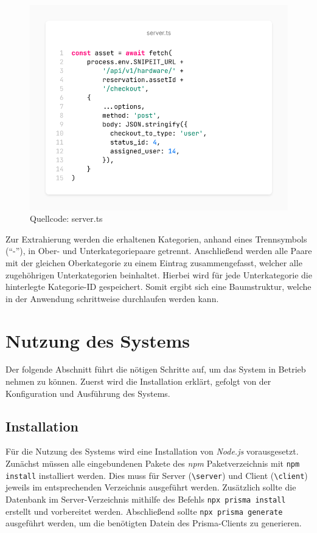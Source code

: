 \begin{figure}[h]
  \centering
  \includegraphics[scale=0.4]{Bilder/screenshot(5).png}
  \caption[Quellcode: server.ts]{Quellcode: server.ts}
  \label{fig:categoriecode}
\end{figure}

Zur Extrahierung werden die erhaltenen Kategorien, anhand eines Trennsymbols (\enquote{-}), in Ober- und
Unterkategoriepaare getrennt. Anschließend werden alle Paare mit der gleichen Oberkategorie zu einem
Eintrag zusammengefasst, welcher alle zugehöhrigen Unterkategorien beinhaltet. Hierbei wird für jede
Unterkategorie die hinterlegte Kategorie-ID gespeichert. Somit ergibt sich eine Baumstruktur, welche
in der Anwendung schrittweise durchlaufen werden kann.


\section{Nutzung des Systems}
Der folgende Abschnitt führt die nötigen Schritte auf, um das System in Betrieb nehmen zu können.
Zuerst wird die Installation erklärt, gefolgt von der Konfiguration und Ausführung des Systems.

\subsection{Installation}
Für die Nutzung des Systems wird eine Installation von \textit{Node.js} vorausgesetzt. Zunächst
müssen alle eingebundenen Pakete des \textit{npm} Paketverzeichnis mit \lstinline{npm install}
installiert werden. Dies muss für Server (\lstinline{\server}) und Client (\lstinline{\client})
jeweils im entsprechenden Verzeichnis ausgeführt werden. Zusätzlich sollte die Datenbank im
Server-Verzeichnis mithilfe des Befehls \lstinline{npx prisma install }
erstellt und vorbereitet werden. Abschließend sollte \lstinline{npx prisma generate} ausgeführt
werden, um die benötigten Datein des Prisma-Clients zu generieren.

